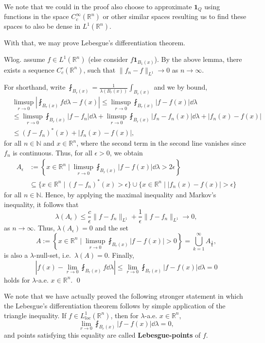 \documentclass[
]{article}
\theoremstyle{definition}
\theoremstyle{definition}
\begin{document}
We note that we could in the proof also choose to approximate
\(\mathbf{1}_Q\) using functions in the space
\(C^\infty_c(\mathbb{R}^n)\) or other similar spaces resulting us to
find these spaces to also be dense in \(L^1(\mathbb{R}^n)\).

With that, we may prove Lebesgue's differentiation theorem.

\proof

Wlog. assume \(f \in L^1(\mathbb{R}^n)\) (else consider
\(f \mathbf{1}_{B_1(x)}\)). By the above lemma, there exists a sequence
\(C_c^\circ(\mathbb{R}^n)\), such that \(\|f_n - f\|_{L^1} \to 0\) as
\(n \to \infty\).

For shorthand, write
\(\fint_{B_r(x)} = \frac{1}{\lambda(B_r(x))}  \int_{B_r(x)}\) and we by
bound, \[\begin{split}
    & \limsup_{r \to 0} \left| \fint_{B_r(x)} f \dd \lambda - f(x) \right| \le 
      \limsup_{r \to 0} \fint_{B_r(x)} |f - f(x)| \dd \lambda\\
    & \le \limsup_{r \to 0} \fint_{B_r(x)} |f - f_n| \dd \lambda + 
      \limsup_{r \to 0} \fint_{B_r(x)} |f_n - f_n(x)| \dd \lambda + |f_n(x) - f(x)|\\
    & \le (f - f_n)^*(x) + |f_n(x) - f(x)|,
  \end{split}\] for all \(n \in \mathbb{N}\) and \(x \in \mathbb{R}^n\),
where the second term in the second line vanishes since \(f_n\) is
continuous. Thus, for all \(\epsilon > 0\), we obtain \[\begin{split}
    A_\epsilon & := \left\{x \in \mathbb{R}^n \mid \limsup_{r \to 0} 
      \fint_{B_r(x)} |f - f(x)| \dd \lambda > 2 \epsilon\right\} \\
      & \subseteq \{x \in \mathbb{R}^n \mid (f - f_n)^*(x) > \epsilon\} 
        \cup \{x \in \mathbb{R}^n \mid |f_n(x) - f(x)| > \epsilon\}
  \end{split}\] for all \(n \in \mathbb{N}\). Hence, by applying the
maximal inequality and Markov's inequality, it follows that
\[\lambda(A_\epsilon) \le \frac{c}{\epsilon} \|f - f_n\|_{L^1} 
    + \frac{1}{\epsilon} \|f - f_n\|_{L^1} \to 0,\] as \(n \to \infty\).
Thus, \(\lambda(A_\epsilon) = 0\) and the set
\[A := \left\{x \in \mathbb{R}^n \mid \limsup_{r \to 0} \fint_{B_r(x)} |f - f(x)| > 0 \right\} 
    = \bigcup_{k = 1}^\infty A_{\frac{1}{k}},\] is also a
\(\lambda\)-null-set, i.e.~\(\lambda(A) = 0\). Finally,
\[\left| f(x) - \lim_{r \to 0} \fint_{B_r(x)} f \dd \lambda \right|
    \le \lim_{r \to 0} \fint_{B_r(x)} |f - f(x)| \dd \lambda = 0\] holds
for \(\lambda\)-a.e. \(x \in \mathbb{R}^n\). \qed

We note that we have actually proved the following stronger statement in
which the Lebesgue's differentiation theorem follows by simple
application of the triangle inequality. If
\(f \in L_{loc}^1(\mathbb{R}^n)\), then for \(\lambda\)-a.e.
\(x \in \mathbb{R}^n\),
\[\lim_{r \to 0} \fint_{B_r(x)} |f - f(x)| \dd \lambda = 0,\] and points
satisfying this equality are called \textbf{Lebesgue-points} of \(f\).
\end{document}
